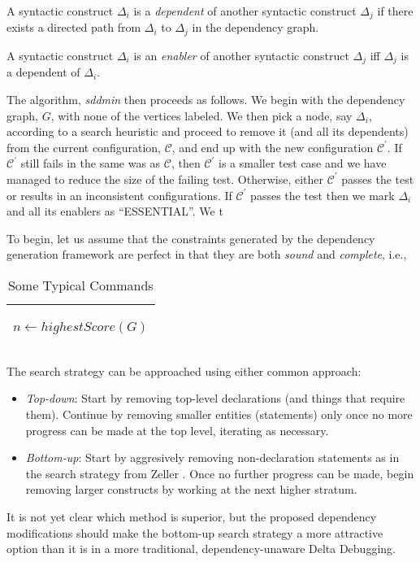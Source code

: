 \documentclass[preprint]{acm_proc_article-sp}
\newenvironment{definition}[1][Definition]{\begin{trivlist}
\item[\hskip \labelsep {\bfseries #1}]}{\end{trivlist}}
\begin{document}
\begin{definition}
A syntactic construct $\Delta_i$ is a \emph{dependent} of another syntactic
construct $\Delta_j$ if there exists a directed path from $\Delta_i$ to
$\Delta_j$ in the dependency graph.
\end{definition}

\begin{definition}
A syntactic construct $\Delta_i$ is an \emph{enabler} of another syntactic
construct $\Delta_j$ iff $\Delta_j$ is a dependent of $\Delta_i$.
\end{definition}

The algorithm, \emph{sddmin} then proceeds as follows. We begin with the
dependency graph, $G$, with none of the vertices labeled. We then pick a node,
say $\Delta_i$, according to a search heuristic and proceed to remove it (and
all its dependents) from the current configuration, $\mathcal{C}$, and end up
with the new configuration $\mathcal{C}^{'}$. If $\mathcal{C}^{'}$ still fails
in the same was as $\mathcal{C}$, then $\mathcal{C}^{'}$ is a smaller test case
and we have managed to reduce the size of the failing test. Otherwise, either
$\mathcal{C}^{'}$ passes the test or results in an inconsistent
configurations. If $\mathcal{C}^{'}$ passes the test then we mark $\Delta_i$ and
all its enablers as ``ESSENTIAL''. We t

To begin, let us assume that the constraints generated by the dependency
generation framework are perfect in that they are both \emph{sound} and
\emph{complete}, i.e., 

\begin{table*}
\centering
\begin{tabular}{| p{} |} \hline
\begin{algorithmic}
\WHILE{unmarked node}
\STATE $n \gets highestScore(G)$

\ENDWHILE
\end{algorithmic}

\\  \hline
\end{tabular}
\caption{Some Typical Commands}
\end{table*}


The search strategy can be approached using either common approach:
\begin{itemize}
\item \emph{Top-down}: Start by removing top-level declarations (and things that
  require them). Continue by removing smaller entities (statements) only once no
  more progress can be made at the top level, iterating as necessary.
\item \emph{Bottom-up}: Start by aggresively removing non-declaration statements
  as in the search strategy from Zeller \citet{dd}. Once no further progress can
  be made, begin removing larger constructs by working at the next higher
  stratum.
\end{itemize}
It is not yet clear which method is superior, but the proposed dependency
modifications should make the bottom-up search strategy a more attractive option
than it is in a more traditional, dependency-unaware Delta Debugging.
\end{document}
